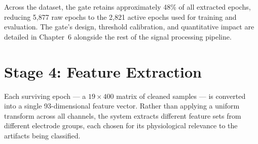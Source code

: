 Across the dataset, the gate retains approximately 48\% of all
extracted epochs, reducing 5{,}877 raw epochs to the 2{,}821 active
epochs used for training and evaluation. The gate's design,
threshold calibration, and quantitative impact are detailed in
Chapter~6 alongside the rest of the signal processing pipeline.

\section{Stage 4: Feature Extraction}
\label{sec:mo_features}

Each surviving epoch --- a $19 \times 400$ matrix of cleaned samples
--- is converted into a single 93-dimensional feature vector. Rather
than applying a uniform transform across all channels, the system
extracts different feature sets from different electrode groups,
each chosen for its physiological relevance to the artifacts being
classified.

